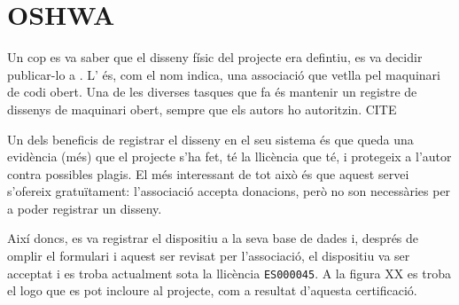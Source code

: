 \section{OSHWA}

Un cop es va saber que el disseny físic del projecte era defintiu, es va decidir
publicar-lo a . L' és, com el
nom indica, una associació que vetlla pel maquinari de codi obert. Una de les
diverses tasques que fa és mantenir un registre de dissenys de maquinari obert,
sempre que els autors ho autoritzin. CITE

Un dels beneficis de registrar el disseny en el seu sistema és que queda una
evidència (més) que el projecte s'ha fet, té la llicència que té, i protegeix
a l'autor contra possibles plagis. El més interessant de tot això és que aquest
servei s'ofereix gratuïtament: l'associació accepta donacions, però no son
necessàries per a poder registrar un disseny.

Així doncs, es va registrar el dispositiu a la seva base de dades i, després
de omplir el formulari i aquest ser revisat per l'associació, el dispositiu
va ser acceptat i es troba actualment sota la llicència \verb|ES000045|.
A la figura XX es troba el logo que es pot incloure al projecte, com a
resultat d'aquesta certificació.
